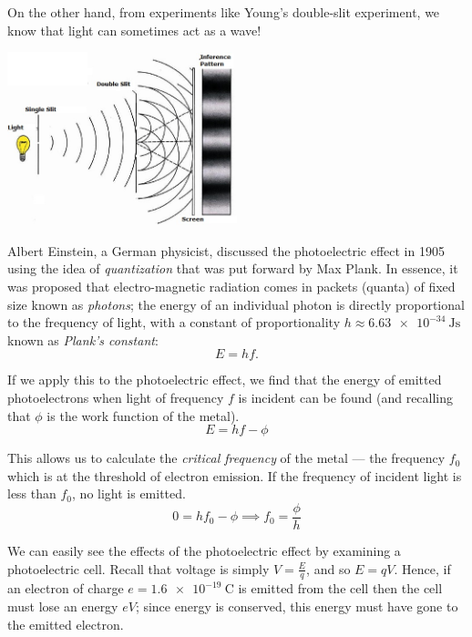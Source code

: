 \documentclass[answers]{exam}
\theoremstyle{definition}
\begin{document}
On the other hand, from experiments like Young's double-slit experiment, we know that
light can sometimes act as a wave!

\begin{center}
  \includegraphics[width=0.5\textwidth]{doubleslit}
\end{center}

Albert Einstein, a German physicist, discussed the photoelectric effect in 1905 using the
idea of \textit{quantization} that was put forward by Max Plank. In essence, it was
proposed that electro-magnetic radiation comes in packets (quanta) of fixed size known
as \textit{photons}; the energy of an individual photon is directly proportional to the frequency of
light, with a constant of proportionality $ h \approx \SI{6.63e-34}{\joule\second} $ known
as \textit{Plank's constant}:
\begin{displaymath}
  E = hf.
\end{displaymath}

If we apply this to the photoelectric effect, we find that the energy of emitted photoelectrons
when light of frequency $ f $ is incident can be found (and recalling that $ \phi $ is the work
function of the metal).
\begin{displaymath}
  E = hf - \phi
\end{displaymath}

This allows us to calculate the \textit{critical frequency} of the metal --- the frequency $ f_0 $ which
is at the threshold of electron emission. If the frequency of incident light is less than $ f_0 $, no
light is emitted.
\begin{displaymath}
  0 = hf_0 - \phi \implies f_0 = \frac{\phi}{h}
\end{displaymath}

We can easily see the effects of the photoelectric effect by examining a photoelectric cell.
Recall that voltage is simply $ V = \frac{E}{q} $, and so $ E = qV $. Hence, if an electron
of charge $ e = \SI{1.6e-19}{\coulomb} $ is emitted from the cell then the cell must
lose an energy $ eV $; since energy is conserved, this energy must have gone to the emitted
electron.
\end{document}
